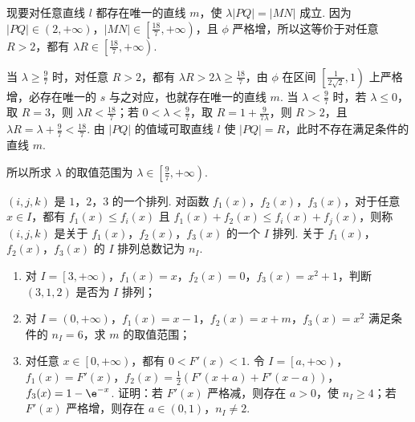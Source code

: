 \begin{solution}
\begin{enumerate}
现要对任意直线 \( l \) 都存在唯一的直线 \( m \)，使 \( \lambda \left| PQ \right|=\left| MN \right| \) 成立. 因为 \( \left| PQ \right| \in \left( 2,+\infty \right) \)，\( \left| MN \right| \in \left[ \frac{18}{7},+\infty \right) \)，且 \( \phi \) 严格增，所以这等价于对任意 \( R>2 \)，都有 \( \lambda R\in \left[ \frac{18}{7},+\infty \right) \).

当 \( \lambda\ge \frac{9}{7} \) 时，对任意 \( R>2 \)，都有 \( \lambda R>2\lambda\ge \frac{18}{7} \)，由 \( \phi \) 在区间 \( \left[ \frac{1}{2\sqrt{2}},1 \right) \) 上严格增，必存在唯一的 \( s \) 与之对应，也就存在唯一的直线 \( m \). 当 \( \lambda<\frac{9}{7} \) 时，若 \( \lambda\le 0 \)，取 \( R=3 \)，则 \( \lambda R<\frac{18}{7} \)；若 \( 0<\lambda<\frac{9}{7} \)，取 \( R=1+\frac{9}{7\lambda} \)，则 \( R>2 \)，且 \( \lambda R=\lambda+\frac{9}{7}<\frac{18}{7} \). 由 \( \left| PQ \right| \) 的值域可取直线 \( l \) 使 \( \left| PQ \right|=R \)，此时不存在满足条件的直线 \( m \).

所以所求 \( \lambda \) 的取值范围为 \( \lambda\in \left[ \frac{9}{7},+\infty \right) \).
\end{enumerate}
\end{solution}

\begin{problem}
\( \left( i,j,k \right) \) 是 \(1\)，\(2\)，\(3\) 的一个排列. 对函数 \( f_1(x) \)，\( f_2(x) \)，\( f_3(x) \)，对于任意 \( x\in I \)，都有 \( f_1(x)\le f_i(x) \) 且 \( f_1(x)+f_2(x)\le f_i(x)+f_j(x) \)，则称 \( \left( i,j,k \right) \) 是关于 \( f_1(x) \)，\( f_2(x) \)，\( f_3(x) \) 的一个 \(I\) 排列. 关于 \( f_1(x) \)，\( f_2(x) \)，\( f_3(x) \) 的 \(I\) 排列总数记为 \( n_I \).

\begin{enumerate}
\item 对 \( I=\left[ 3,+\infty \right) \)，\( f_1(x)=x \)，\( f_2(x)=0 \)，\( f_3(x)=x^2+1 \)，判断 \( \left( 3,1,2 \right) \) 是否为 \(I\) 排列；
\item 对 \( I=\left( 0,+\infty \right) \)，\( f_1(x)=x-1 \)，\( f_2(x)=x+m \)，\( f_3(x)=x^2 \) 满足条件的 \( n_I=6 \)，求 \( m \) 的取值范围；
\item 对任意 \( x\in \left[ 0,+\infty \right) \)，都有 \( 0<F'(x)<1 \). 令 \( I=\left[ a,+\infty \right) \)，\( f_1(x)=F'(x) \)，\( f_2(x)=\frac{1}{2}\left( F'\left( x+a \right)+F'\left( x-a \right) \right) \)，\( f_3(x)=1-\e^{-x} \). 证明：若 \( F'(x) \) 严格减，则存在 \( a>0 \)，使 \( n_I\ge 4 \)；若 \( F'(x) \) 严格增，则存在 \( a\in \left( 0,1 \right) \)，\( n_I\neq 2 \).
\end{enumerate}
\end{problem}


